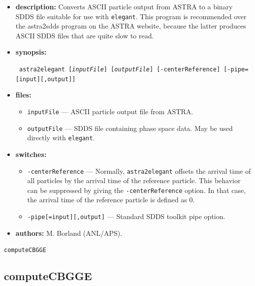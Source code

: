 \documentclass[11pt]{article}
\begin{document}
\begin{itemize}
\item {\bf description:}   Converts ASCII particle output from ASTRA to a binary
SDDS file suitable for use with {\tt elegant}.  This program is recommended over
the astra2sdds program on the ASTRA website, because the latter produces ASCII SDDS
files that are quite slow to read.

\item {\bf synopsis:}
\begin{flushleft}{\tt
astra2elegant [{\em inputFile}] [{\em outputFile}] [-centerReference] [-pipe=[input][,output]]
}\end{flushleft}

\item {\bf files:}
\begin{itemize}
\item {\tt inputFile} --- ASCII particle output file from ASTRA.
\item {\tt outputFile} --- SDDS file containing phase space data. May be used directly with 
{\tt elegant}.
\end{itemize}

\item {\bf switches:}
\begin{itemize}
\item {\tt -centerReference} --- Normally, {\tt astra2elegant} offsets the arrival time of all particles
  by the arrival time of the reference particle.  This behavior can be suppressed by giving the
  {\tt -centerReference} option.  In that case, the arrival time of the reference particle is defined
  as 0.
\item {\tt -pipe[=input][,output]} --- Standard SDDS toolkit pipe option.
\end{itemize}

\item {\bf authors:} M. Borland (ANL/APS).

\end{itemize}

\newpage
\begin{center}{\Large\verb|computeCBGGE|}\end{center}
\subsection{computeCBGGE\label{computeCBGGE}}
\end{document}
